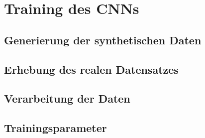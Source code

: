 
\section{Training des CNNs}

\subsection{Generierung der synthetischen Daten}
\subsection{Erhebung des realen Datensatzes}
\subsection{Verarbeitung der Daten}
\subsection{Trainingsparameter}
